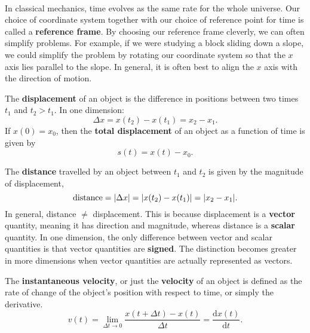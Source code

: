\documentclass[../newtonian_mechanics.tex]{subfiles}
\begin{document}
        \paragraph{}
        In classical mechanics, time evolves as the same rate for the whole universe. Our choice of coordinate system together with our choice of reference point for time is called a \textbf{reference frame}. By choosing our reference frame cleverly, we can often simplify problems. For example, if we were studying a block sliding down a slope, we could simplify the problem by rotating our coordinate system so that the $x$ axis lies parallel to the slope. In general, it is often best to align the $x$ axis with the direction of motion.
        \begin{definition}
            The \textbf{displacement} of an object is the difference in positions between two times $t_1$ and $t_2>t_1$. In one dimension:
            \begin{equation}
                \Delta x=x(t_2)-x(t_1)=x_2-x_1.
            \end{equation}
            If $x(0)=x_0$, then the \textbf{total displacement} of an object as a function of time is given by
            \begin{equation}
                s(t)=x(t)-x_0.
            \end{equation}
        \end{definition}
        The \textbf{distance} travelled by an object between $t_1$ and $t_2$ is given by the magnitude of displacement,
        \begin{equation}
            \mathrm{distance}=\lvert\Delta x\rvert=\lvert x(t_2)-x(t_1)\rvert=\lvert x_2-x_1\rvert.
        \end{equation}
        In general, distance $\neq$ displacement. This is because displacement is a \textbf{vector} quantity, meaning it has direction and magnitude, whereas distance is a \textbf{scalar} quantity. In one dimension, the only difference between vector and scalar quantities is that vector quantities are \textbf{signed}. The distinction becomes greater in more dimensions when vector quantities are actually represented as vectors.
        \begin{definition}
            The \textbf{instantaneous velocity}, or just the \textbf{velocity} of an object is defined as the rate of change of the object's position with respect to time, or simply the derivative.
            \begin{equation}
                v(t)=\lim_{\Delta t\to0}\frac{x(t+\Delta t)-x(t)}{\Delta t}=\frac{\mathrm{d}x(t)}{\mathrm{d}t}.
            \end{equation}
        \end{definition}
\end{document}
